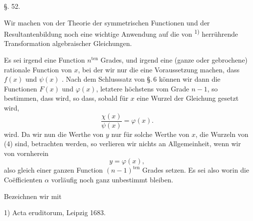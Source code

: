 
\begin{center}
§. 52.

\end{center}

Wir machen von der Theorie der symmetrischen Functionen und der Resultantenbildung noch eine wichtige Anwendung auf die von \textsuperscript{1)} herrührende Transformation algebraischer Gleichungen.

Es sei
irgend eine Function $n^{\text{ten}}$ Grades, und
irgend eine (ganze oder gebrochene) rationale Function von $x$, bei der wir nur die eine Voraussetzung machen, dass $f(x)$ und $\psi(x)$ . Nach dem Schlusssatz von \S.\,6 können wir dann die Functionen $F(x)$ und $\varphi(x)$, letztere höchstens vom Grade $n-1$, so bestimmen, dass
wird, so dass, sobald für $x$ eine Wurzel der Gleichung
gesetzt wird,
\[
\frac{\chi(x)}{\psi(x)} = \varphi(x). %
\]
wird. Da wir nun die Werthe von $y$ nur für solche Werthe von $x$, die Wurzeln von (4) sind, betrachten werden, so verlieren wir nichts an Allgemeinheit, wenn wir von vornherein
\[
y = \varphi(x),
\]
also gleich einer ganzen Function $(n-1)^{\text{ten}}$ Grades setzen. Es sei also
worin die Co\"efficienten $\alpha$ vorläufig noch ganz unbestimmt bleiben.

Bezeichnen wir mit

\par\smallskip
{\small 1) Acta eruditorum, Leipzig 1683.}\par
